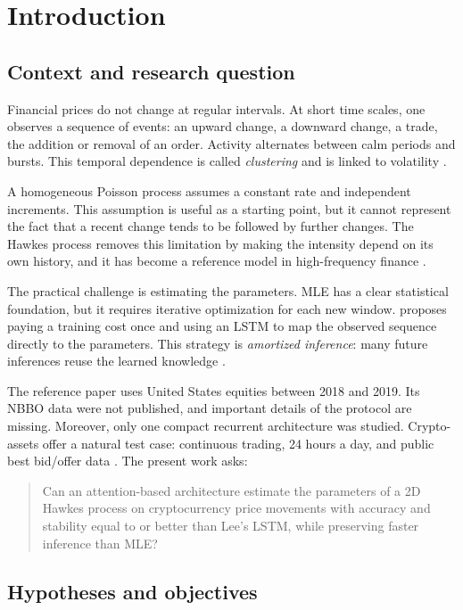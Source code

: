 \chapter{Introduction}

\section{Context and research question}

Financial prices do not change at regular intervals. At short time scales, one
observes a sequence of events: an upward change, a downward change, a trade, the
addition or removal of an order. Activity alternates between calm periods and bursts.
This temporal dependence is called \emph{clustering} and is linked to volatility
\citep{bouchaud2018}.

A homogeneous Poisson process assumes a constant rate and independent increments.
This assumption is useful as a starting point, but it cannot represent the fact that
a recent change tends to be followed by further changes. The Hawkes process
\citep{hawkes1971,hawkes1971b} removes this limitation by making the intensity depend
on its own history, and it has become a reference model in high-frequency finance
\citep{bacry2015,hawkes2018}.

The practical challenge is estimating the parameters. MLE has a clear statistical
foundation, but it requires iterative optimization for each new window.
\citet{lee2023} proposes paying a training cost once and using an LSTM to map the
observed sequence directly to the parameters. This strategy is \emph{amortized
inference}: many future inferences reuse the learned knowledge \citep{cranmer2020}.

The reference paper uses United States equities between 2018 and 2019. Its NBBO data
were not published, and important details of the protocol are missing. Moreover, only
one compact recurrent architecture was studied. Crypto-assets offer a natural test
case: continuous trading, 24 hours a day, and public best bid/offer data
\citep{makarov2020}. The present work asks:

\begin{quote}
Can an attention-based architecture estimate the parameters of a 2D Hawkes process on
cryptocurrency price movements with accuracy and stability equal to or better than
Lee's LSTM, while preserving faster inference than MLE?
\end{quote}

\section{Hypotheses and objectives}

